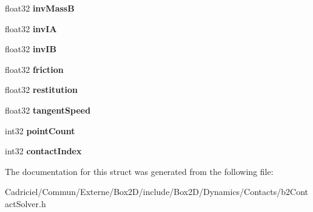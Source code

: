 \begin{DoxyCompactItemize}
\item 
float32 {\bfseries inv\+MassB}\hypertarget{structb2_contact_velocity_constraint_ac75c816e94402ed4d93f232d211d4f62}{}\label{structb2_contact_velocity_constraint_ac75c816e94402ed4d93f232d211d4f62}

\item 
float32 {\bfseries inv\+IA}\hypertarget{structb2_contact_velocity_constraint_ac6c18706a9ee89c5a682dc610e86e00f}{}\label{structb2_contact_velocity_constraint_ac6c18706a9ee89c5a682dc610e86e00f}

\item 
float32 {\bfseries inv\+IB}\hypertarget{structb2_contact_velocity_constraint_aae02d4fd8f60353385b9cc876dc78a81}{}\label{structb2_contact_velocity_constraint_aae02d4fd8f60353385b9cc876dc78a81}

\item 
float32 {\bfseries friction}\hypertarget{structb2_contact_velocity_constraint_a11025786ae828eeeb60dfcd15358d934}{}\label{structb2_contact_velocity_constraint_a11025786ae828eeeb60dfcd15358d934}

\item 
float32 {\bfseries restitution}\hypertarget{structb2_contact_velocity_constraint_a6734f74c1970abc64ed7dcffd8737257}{}\label{structb2_contact_velocity_constraint_a6734f74c1970abc64ed7dcffd8737257}

\item 
float32 {\bfseries tangent\+Speed}\hypertarget{structb2_contact_velocity_constraint_aaf6acabb0ef62eeac647250e2520a272}{}\label{structb2_contact_velocity_constraint_aaf6acabb0ef62eeac647250e2520a272}

\item 
int32 {\bfseries point\+Count}\hypertarget{structb2_contact_velocity_constraint_a1decd7bf6a5dc61bd72d4e87b070a660}{}\label{structb2_contact_velocity_constraint_a1decd7bf6a5dc61bd72d4e87b070a660}

\item 
int32 {\bfseries contact\+Index}\hypertarget{structb2_contact_velocity_constraint_a4c76b9292f28859e2f8c9d075e79b873}{}\label{structb2_contact_velocity_constraint_a4c76b9292f28859e2f8c9d075e79b873}

\end{DoxyCompactItemize}


The documentation for this struct was generated from the following file\+:\begin{DoxyCompactItemize}
\item 
Cadriciel/\+Commun/\+Externe/\+Box2\+D/include/\+Box2\+D/\+Dynamics/\+Contacts/b2\+Contact\+Solver.\+h\end{DoxyCompactItemize}
